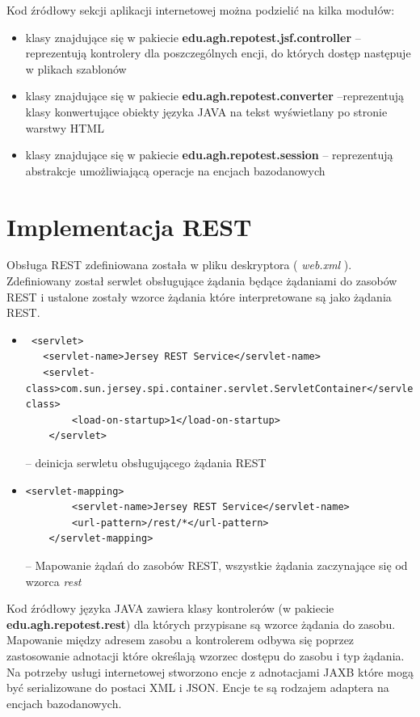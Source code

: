 Kod źródłowy sekcji aplikacji internetowej można podzielić na kilka modułów:
\begin{itemize}
  \item klasy znajdujące się w pakiecie \textbf{edu.agh.repotest.jsf.controller} -- reprezentują kontrolery dla poszczególnych encji, do których dostęp następuje w plikach szablonów
  \item klasy znajdujące się w pakiecie \textbf{edu.agh.repotest.converter} --reprezentują klasy konwertujące obiekty języka JAVA na tekst wyświetlany po stronie warstwy HTML
  \item klasy znajdujące się w pakiecie \textbf{edu.agh.repotest.session} -- reprezentują abstrakcje umożliwiającą operacje na encjach bazodanowych
   
\end{itemize}


\section{Implementacja REST}

Obsługa REST zdefiniowana została w pliku deskryptora ( \textit{web.xml} ). Zdefiniowany został serwlet obsługujące żądania będące żądaniami do zasobów REST i ustalone zostały wzorce żądania które interpretowane są jako żądania REST. 
\begin{itemize}
	\item  {\footnotesize \begin{verbatim} <servlet>
   <servlet-name>Jersey REST Service</servlet-name>
   <servlet-class>com.sun.jersey.spi.container.servlet.ServletContainer</servlet-class>
        <load-on-startup>1</load-on-startup>
    </servlet> \end{verbatim}} -- deinicja serwletu obsługującego żądania REST
 	\item  {\footnotesize \begin{verbatim}<servlet-mapping>
        <servlet-name>Jersey REST Service</servlet-name>
        <url-pattern>/rest/*</url-pattern>
    </servlet-mapping>\end{verbatim}} -- Mapowanie żądań do zasobów REST, wszystkie żądania zaczynające się od wzorca \textit{rest}
  \end{itemize}
  
  
  Kod źródłowy języka JAVA zawiera klasy kontrolerów (w pakiecie \textbf{edu.agh.repotest.rest}) dla których przypisane są wzorce żądania do zasobu. Mapowanie między adresem zasobu a kontrolerem odbywa się poprzez zastosowanie adnotacji które określają wzorzec dostępu do zasobu i typ żądania. Na potrzeby usługi internetowej stworzono encje z adnotacjami JAXB które mogą być serializowane do postaci XML i JSON. Encje te są rodzajem adaptera na encjach bazodanowych.
  \newpage
  
